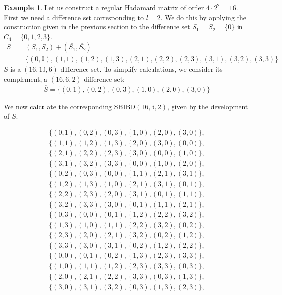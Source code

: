\documentclass[12pt,a4paper]{article}
\theoremstyle{definition}
\newtheorem{example}[theorem]{Example}
\begin{document}
\begin{example}
Let us construct a regular Hadamard matrix of order $4 \cdot 2^2 = 16$. First we need a difference set corresponding to $l = 2$. We do this by applying the construction given in the previous section to the difference set $S_1 = S_2 = \{0\}$ in $C_4 = \{0, 1, 2, 3\}$.
\begin{align*}
S &= (S_1, S_2) + (\overline{S_1}, \overline{S_2}) \\
&= \{ (0, 0), (1, 1), (1, 2), (1, 3), (2, 1), (2, 2), (2, 3), (3, 1), (3, 2), (3, 3) \}
\end{align*}
$S$ is a $(16, 10, 6)$-difference set. To simplify calculations, we consider its complement, a $(16, 6, 2)$-difference set:
\begin{align*}
\overline{S} = \{ (0, 1), (0, 2), (0, 3), (1, 0), (2, 0), (3, 0) \}
\end{align*}

We now calculate the corresponding SBIBD$(16, 6, 2)$, given by the development of $\overline{S}$.

\begin{align*}
\{ (0, 1), (0, 2), (0, 3), (1, 0), (2, 0), (3, 0) \}, \\
\{ (1, 1), (1, 2), (1, 3), (2, 0), (3, 0), (0, 0) \}, \\
\{ (2, 1), (2, 2), (2, 3), (3, 0), (0, 0), (1, 0) \}, \\
\{ (3, 1), (3, 2), (3, 3), (0, 0), (1, 0), (2, 0) \}, \\
\{ (0, 2), (0, 3), (0, 0), (1, 1), (2, 1), (3, 1) \}, \\
\{ (1, 2), (1, 3), (1, 0), (2, 1), (3, 1), (0, 1) \}, \\
\{ (2, 2), (2, 3), (2, 0), (3, 1), (0, 1), (1, 1) \}, \\
\{ (3, 2), (3, 3), (3, 0), (0, 1), (1, 1), (2, 1) \}, \\
\{ (0, 3), (0, 0), (0, 1), (1, 2), (2, 2), (3, 2) \}, \\
\{ (1, 3), (1, 0), (1, 1), (2, 2), (3, 2), (0, 2) \}, \\
\{ (2, 3), (2, 0), (2, 1), (3, 2), (0, 2), (1, 2) \}, \\
\{ (3, 3), (3, 0), (3, 1), (0, 2), (1, 2), (2, 2) \}, \\
\{ (0, 0), (0, 1), (0, 2), (1, 3), (2, 3), (3, 3) \}, \\
\{ (1, 0), (1, 1), (1, 2), (2, 3), (3, 3), (0, 3) \}, \\
\{ (2, 0), (2, 1), (2, 2), (3, 3), (0, 3), (1, 3) \}, \\
\{ (3, 0), (3, 1), (3, 2), (0, 3), (1, 3), (2, 3) \},
\end{align*}


\end{example}
\end{document}
